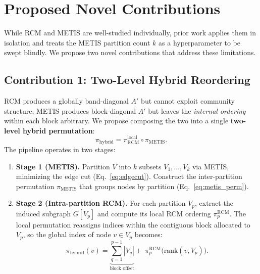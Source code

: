 \documentclass[sigconf,review]{acmart}
\begin{document}
\section{Proposed Novel Contributions}
\label{sec:novel}

While RCM and METIS are well-studied individually, prior work applies them in isolation and treats the METIS partition count $k$ as a hyperparameter to be swept blindly. We propose two novel contributions that address these limitations.

\subsection{Contribution 1: Two-Level Hybrid Reordering}
\label{sec:hybrid}

RCM produces a globally band-diagonal $A'$ but cannot exploit community structure; METIS produces block-diagonal $A'$ but leaves the \emph{internal ordering} within each block arbitrary. We propose composing the two into a single \textbf{two-level hybrid permutation}:
\begin{equation}\label{eq:hybrid}
    \pi_{\text{hybrid}} = \pi_{\text{RCM}}^{\text{local}} \circ \pi_{\text{METIS}}.
\end{equation}
The pipeline operates in two stages:
\begin{enumerate}
    \item \textbf{Stage 1 (METIS).} Partition $V$ into $k$ subsets $V_1,\dots,V_k$ via METIS, minimizing the edge cut (Eq.~\eqref{eq:edgecut}). Construct the inter-partition permutation $\pi_{\text{METIS}}$ that groups nodes by partition (Eq.~\eqref{eq:metis_perm}).
    \item \textbf{Stage 2 (Intra-partition RCM).}  For each partition $V_p$, extract the induced subgraph $G[V_p]$ and compute its local RCM ordering $\pi_p^{\text{RCM}}$. The local permutation reassigns indices within the contiguous block allocated to $V_p$, so the global index of node $v \in V_p$ becomes:
    \begin{equation}\label{eq:hybrid_index}
        \pi_{\text{hybrid}}(v) = \underbrace{\sum_{q=1}^{p-1} |V_q|}_{\text{block offset}} + \;\pi_p^{\text{RCM}}\!\bigl(\text{rank}(v, V_p)\bigr).
    \end{equation}
\end{enumerate}
\end{document}
